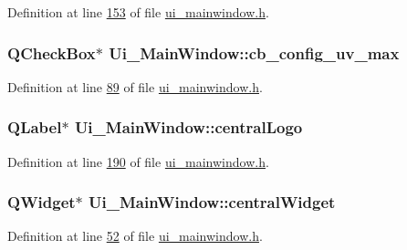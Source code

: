Definition at line \hyperlink{a00052_source_l00153}{153} of file \hyperlink{a00052_source}{ui\+\_\+mainwindow.\+h}.

\hypertarget{a00027_a13ce5fddc83683d7b8b717f0b9a4e2cf}{
\subsubsection[{cb\+\_\+config\+\_\+uv\+\_\+max}]{\setlength{\rightskip}{0pt plus 5cm}Q\+Check\+Box$\ast$ Ui\+\_\+\+Main\+Window\+::cb\+\_\+config\+\_\+uv\+\_\+max}}\label{a00027_a13ce5fddc83683d7b8b717f0b9a4e2cf}


Definition at line \hyperlink{a00052_source_l00089}{89} of file \hyperlink{a00052_source}{ui\+\_\+mainwindow.\+h}.

\hypertarget{a00027_ab5c037236f041a2a7753d3e4efd3d0e8}{
\subsubsection[{central\+Logo}]{\setlength{\rightskip}{0pt plus 5cm}Q\+Label$\ast$ Ui\+\_\+\+Main\+Window\+::central\+Logo}}\label{a00027_ab5c037236f041a2a7753d3e4efd3d0e8}


Definition at line \hyperlink{a00052_source_l00190}{190} of file \hyperlink{a00052_source}{ui\+\_\+mainwindow.\+h}.

\hypertarget{a00027_a30075506c2116c3ed4ff25e07ae75f81}{
\subsubsection[{central\+Widget}]{\setlength{\rightskip}{0pt plus 5cm}Q\+Widget$\ast$ Ui\+\_\+\+Main\+Window\+::central\+Widget}}\label{a00027_a30075506c2116c3ed4ff25e07ae75f81}


Definition at line \hyperlink{a00052_source_l00052}{52} of file \hyperlink{a00052_source}{ui\+\_\+mainwindow.\+h}.



